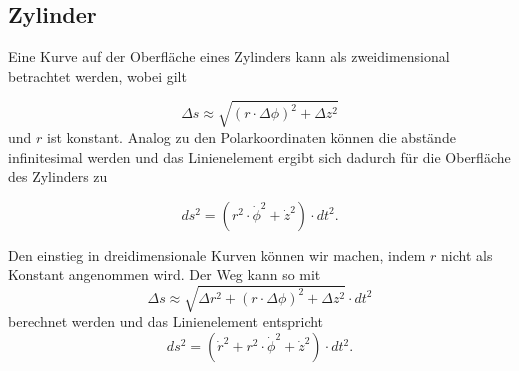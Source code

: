 %
%
%
%
\subsection{Zylinder\label{geodaeten:section:Linienelemente:Zylinder}}

Eine Kurve auf der Oberfläche eines Zylinders kann als zweidimensional betrachtet werden, wobei gilt

\begin{equation}
	\Delta s \approx \sqrt{(r \cdot \Delta \phi)^2 + \Delta z^2}
\end{equation}
und $r$ ist konstant.
Analog zu den Polarkoordinaten können die abstände infinitesimal werden und das Linienelement ergibt sich dadurch für die Oberfläche des Zylinders zu

\begin{equation}
	ds^2 = \left(r^2 \cdot \dot{\phi}^2 +\dot{z}^2\right) \cdot dt^2 .
	\label{geodaeten:equation:Linienelemente:Zylinder:equation2}
\end{equation}

%

Den einstieg in dreidimensionale Kurven können wir machen, indem $r$ nicht als Konstant angenommen wird.
Der Weg kann so mit
\begin{equation}
	\Delta s \approx \sqrt{\Delta r^2 + (r \cdot \Delta \phi)^2 + \Delta z^2} \cdot dt^2
\end{equation}
berechnet werden und das Linienelement entspricht 
\begin{equation}
	ds^2 = \left(\dot{r}^2 + r^2 \cdot \dot{\phi}^2 +\dot{z}^2\right) \cdot dt^2 .
\end{equation}

